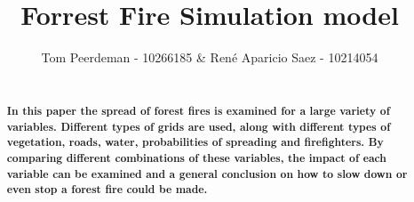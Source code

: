 \documentclass{article}
\title{Forrest Fire Simulation model}
\author{Tom Peerdeman - 10266185 \& Ren\'e Aparicio Saez - 10214054}
\begin{document}

\maketitle

\begin{abstract}
\textbf{\\In this paper the spread of forest fires is examined for a large variety of variables. Different types of grids are used, along with different types of vegetation, roads, water, probabilities of spreading and firefighters. By comparing different combinations of these variables, the impact of each variable can be examined and a general conclusion on how to slow down or even stop a forest fire could be made.}
\end{abstract}
\end{document}

